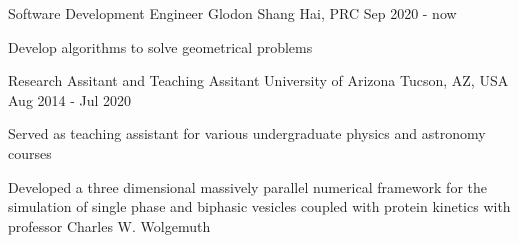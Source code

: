   
  \cventry
    {Software Development Engineer} %
    {Glodon} %
    {Shang Hai, PRC} %
    {Sep 2020 - now} %
    {
      \begin{cvitems} %
         \item {Develop algorithms to solve geometrical problems}    
      \end{cvitems}
    }
    
  \cventry
    {Research Assitant and Teaching Assitant} %
    {University of Arizona} %
    {Tucson, AZ, USA} %
    {Aug 2014 - Jul 2020} %
    {
      \begin{cvitems} %
         \item {Served as teaching assistant for various undergraduate physics and astronomy courses}
         \item {Developed a three dimensional massively parallel numerical framework for the simulation of single phase and biphasic vesicles coupled with protein kinetics with professor Charles W. Wolgemuth}
      \end{cvitems}
    }
  
